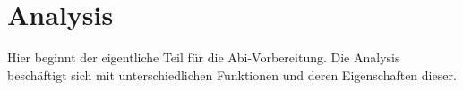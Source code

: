 \chapter{Analysis}
	Hier beginnt der eigentliche Teil für die Abi-Vorbereitung. Die Analysis
	beschäftigt sich mit unterschiedlichen Funktionen und deren Eigenschaften
	dieser.

	

	

	

	
